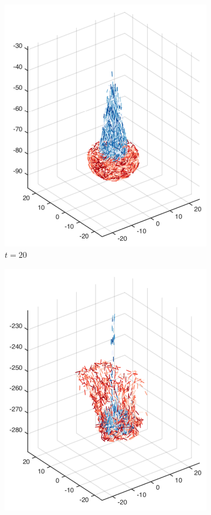 \begin{figure}[!htbp]
\begin{subfigure}[h]{0.24\textwidth}
    \includegraphics[width=\textwidth]{img/mixing/random_00020.pdf}
    \caption{$t=20$}\label{fig:mixing_random_b}
  \end{subfigure}
  \begin{subfigure}[h]{0.24\textwidth}
    \centering
    \includegraphics[width=\textwidth]{img/mixing/random_00100.pdf}

\end{subfigure}
\end{figure}
